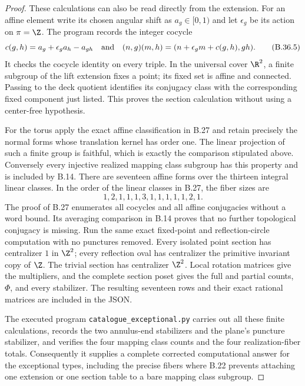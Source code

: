 \begin{proof}
These calculations can also be read directly from the extension.
For an affine element write its chosen angular shift as
$a_g\in[0,1)$ and let $\epsilon_g$ be its action on $\pi=\Z$.
The program records the integer cocycle
\[
 c(g,h)=a_g+\epsilon_ga_h-a_{gh}
 \quad\hbox{and}\quad
 (n,g)(m,h)=(n+\epsilon_gm+c(g,h),gh).                 \tag{B.36.5}
\]
It checks the cocycle identity on every triple.
In the universal cover $\R^2$, a finite subgroup of the lift
extension fixes a point; its fixed set is affine and connected.
Passing to the deck quotient identifies its conjugacy class
with the corresponding fixed component just listed.
This proves the section calculation without using a
center-free hypothesis.

For the torus apply the exact affine classification in B.27 and
retain precisely the normal forms whose translation kernel has
order one.  The linear projection of such a finite group is
faithful, which is exactly the comparison stipulated above.
Conversely every injective realized mapping class subgroup has
this property and is included by B.14.
There are seventeen affine forms over the thirteen integral
linear classes.  In the order of the linear classes in B.27,
the fiber sizes are
\[
                   1,2,1,1,1,3,1,1,1,1,1,2,1.       \tag{B.36.6}
\]
The proof of B.27 enumerates all cocycles and all affine
conjugacies without a word bound.  Its averaging comparison in
B.14 proves that no further topological conjugacy is missing.
Run the same exact fixed-point and reflection-circle computation
with no punctures removed.  Every isolated point section has
centralizer $1$ in $\Z^2$; every reflection oval has centralizer
the primitive invariant copy of $\Z$.  The trivial section has
centralizer $\Z^2$.  Local rotation matrices give the multipliers,
and the complete section poset gives the full and partial counts,
$\Phi$, and every stabilizer.  The resulting seventeen rows and
their exact rational matrices are included in the JSON.

The executed program \texttt{catalogue\_exceptional.py} carries
out all these finite calculations, records the two annulus-end
stabilizers and the plane's puncture stabilizer, and verifies the
four mapping class counts and the four realization-fiber totals.
Consequently it supplies a complete corrected computational
answer for the exceptional types, including the precise fibers
where B.22 prevents attaching one extension or one section table
to a bare mapping class subgroup.
\end{proof}
